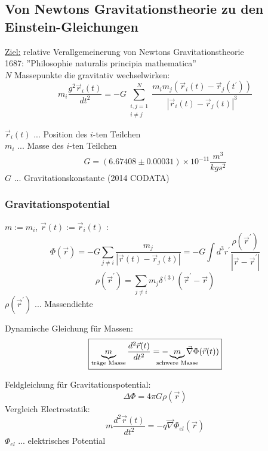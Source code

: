 \documentclass[a4paper, 11pt]{article}
\numberwithin{equation}{section}
\begin{document}
\subsection{Von Newtons Gravitationstheorie zu den \\Einstein-Gleichungen}
\underline{Ziel:} relative Verallgemeinerung von Newtons Gravitationstheorie\\
1687: ''Philosophie naturalis principia mathematica''\\
$N$ Massepunkte die gravitativ wechselwirken: 
\begin{equation}
\label{glg:0_Newton}
m_i \dfrac{g^2\vec{r}_i(t)}{dt^2} = - G \sum^N_{\substack{i,j = 1\\ i \neq j}} \dfrac{m_i m_j (\vec{r} _i(t)-\vec{r}_j(t^\prime))}{|\vec{r}_i(t) - \vec{r}_j(t)|^3}
\end{equation}

$\vec{r}_i(t)$ ... Position des $i$-ten Teilchen\\
$m_i$ ... Masse des $i$-ten Teilchen 
\begin{equation}
G = (6.67408 \pm 0.00031)\times 10^{-11} \dfrac{m^3}{kg s^2}
\end{equation}
$G$ ... Gravitationskonstante (2014 CODATA)

\subsubsection*{Gravitationspotential}
$m:= m_i$, $\vec{r}(t):= \vec{r}_i(t)$ :
\begin{equation}
\label{glg:0_Gravitationspotential}
\Phi(\vec{r}) = - G \sum_{j \neq i} \dfrac{m_j}{|\vec{r}(t)-\vec{r}_j(t)|} = -G \int d^3r^\prime \dfrac{\rho(\vec{r}^\prime)}{|\vec{r}-\vec{r}^\prime|}
\end{equation}
\begin{equation}
\label{glg:0_Massendichte}
\rho(\vec{r}^\prime)=\sum\limits_{j\neq i} m_j \delta^{(3)}(\vec{r}^\prime-\vec{r})
\end{equation}
$\rho(\vec{r}^\prime)$ ... Massendichte


Dynamische Gleichung für Massen:
\begin{equation}
\label{glg:0_dynamischeGleichungFuerMassen}
\boxed{
\underbrace{m}_{\text{träge Masse}} \dfrac{d^2\vec{r}(t)}{dt^2} = -\underbrace{m}_{\mathclap{\text{schwere Masse}}} \vec{\nabla} \Phi(\vec{r}(t))
}
\end{equation}

Feldgleichung für Gravitationspotential:
\begin{equation}
\label{glg:0_FeldgleichungGravitationspotential}
\boxed{
\Delta \Phi = 4 \pi G \rho(\vec{r})
}
\end{equation}
Vergleich Electrostatik:
\begin{equation}
\label{glg:0_LadungImStatischenElektrischenFeld}
m \dfrac{d^2 \vec{r}(t)}{dt^2} = - q \vec{\nabla} \Phi_{el}(\vec{r})
\end{equation}
$\Phi_{el}$ ... elektrisches Potential
\end{document}
